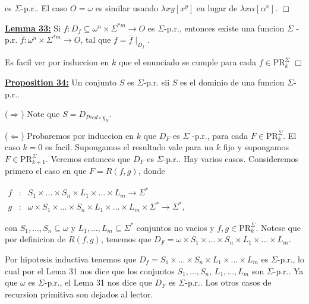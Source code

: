   es \(\Sigma \)-p.r.. El caso \(O=\omega \) es similar usando \(\lambda xy\left[ x^{y}\right] \) en lugar de \(\lambda x\alpha \left[ \alpha ^{x}\right] \). \(\Box\)


  \textbf{\underline{Lemma 33:}} Si \(f:D_{f}\subseteq \omega ^{n}\times \Sigma ^{\ast m}\rightarrow O\) es \(\Sigma \)-p.r., entonces existe una funcion \(\Sigma \) -p.r. \(\bar{f}:\omega ^{n}\times \Sigma ^{\ast m}\rightarrow O\), tal que \(f= \bar{f}\mid _{D_{f}}\).

  \PROOF Es facil ver por induccion en \(k\) que el enunciado se cumple para cada \(f\in \mathrm{PR}_{k}^{\Sigma }\) \(\Box\)


  \textbf{\underline{Proposition 34:}} Un conjunto \(S\) es \(\Sigma \)-p.r. sii \(S\) es el dominio de una funcion \(\Sigma \)-p.r.\(.\)

  \PROOF (\(\Rightarrow \)) Note que \(S=D_{Pred\circ \chi _{S}}.\)

  (\(\Leftarrow \)) Probaremos por induccion en \(k\) que \(D_{F}\) es \(\Sigma \) -p.r., para cada \(F\in \mathrm{PR}_{k}^{\Sigma }.\) El caso \(k=0\) es facil\(.\) Supongamos el resultado vale para un \(k\) fijo y supongamos \(F\in \mathrm{PR} _{k+1}^{\Sigma }.\) Veremos entonces que \(D_{F}\) es \(\Sigma \)-p.r.. Hay varios casos. Consideremos primero el caso en que \(F=R(f,g)\), donde

  \(\displaystyle \begin{array}{rcl} f & :& S_{1}\times ...\times S_{n}\times L_{1}\times ...\times L_{m}\rightarrow \Sigma ^{\ast } \\ g & :& \omega \times S_{1}\times ...\times S_{n}\times L_{1}\times ...\times L_{m}\times \Sigma ^{\ast }\rightarrow \Sigma ^{\ast }, \end{array} \)

  con \(S_{1},...,S_{n}\subseteq \omega \) y \(L_{1},...,L_{m}\subseteq \Sigma ^{\ast }\) conjuntos no vacios y \(f,g\in \mathrm{PR}_{k}^{\Sigma }\). Notese que por definicion de \(R(f,g)\), tenemos que
  \(\displaystyle D_{F}=\omega \times S_{1}\times ...\times S_{n}\times L_{1}\times ...\times L_{m}. \)

  Por hipotesis inductiva tenemos que \(D_{f}=S_{1}\times ...\times S_{n}\times L_{1}\times ...\times L_{m}\) es \(\Sigma \)-p.r., lo cual por el Lema 31 nos dice que los conjuntos \(S_{1},...,S_{n}\), \( L_{1},...,L_{m}\) son \(\Sigma \)-p.r.. Ya que \(\omega \) es \(\Sigma \)-p.r., el Lema 31 nos dice que \(D_{F}\) es \(\Sigma \)-p.r..
  Los otros casos de recursion primitiva son dejados al lector.

